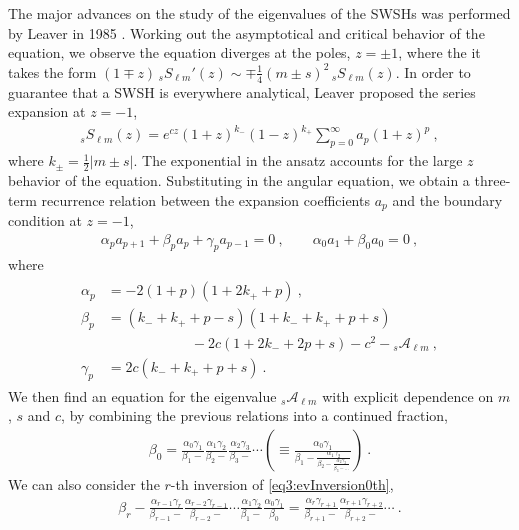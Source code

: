 The major advances on the study of the eigenvalues of the SWSHs was performed by Leaver in 1985 \cite{Leaver1985, Leaver1986}. Working out the asymptotical and critical behavior of the equation, we observe the equation diverges at the poles, $z = \pm 1$, where the it takes the form $(1 \mp z) \,{}_{s}S_{\ell m}{}'(z) \sim \mp \tfrac{1}{4} (m \pm s)^2 \, {}_{s}S_{\ell m}(z)$. In order to guarantee that a SWSH is everywhere analytical, Leaver proposed the series expansion at $z=-1$,
\begin{align}
    \label{eq3:SWSHseriesLeaver}
    {}_{s}S_{\ell m}(z) = e^{c z} (1+z)^{k_-} (1-z)^{k_+} \sum_{p=0}^\infty a_p (1+z)^p ~,
\end{align}
where $k_{\pm} = \tfrac{1}{2}|m \pm s|$.
The exponential in the ansatz accounts for the large $z$ behavior of the equation.
Substituting in the angular equation, we obtain a three-term recurrence relation between the expansion coefficients $a_p$ and the boundary condition at $z=-1$,
\begin{align}
    \label{eq3:ap3CoefRecursion}
    \alpha_p a_{p+1} + \beta_p a_p + \gamma_p a_{p-1} = 0 ~,\qquad
    \alpha_0 a_1 + \beta_0 a_0 = 0 ~,
\end{align}
where
\begin{align}
    \label{eq3:LeaverCoefRecursion}
    \begin{split}
        \alpha_p &= -2 (1 + p) (1 + 2 k_{+} + p) ~,\\
        \beta_p  &= (k_{-} + k_{+} + p - s) (1 + k_{-} + k_{+} + p + s) \\
        &\qquad\qquad\qquad - 2 c (1 + 2 k_{-} + 2 p + s) - c^2 - {}_{s}\mathscr{A}_{\ell m} ~,\\
        \gamma_p &= 2 c (k_{-} + k_{+} + p + s) ~.
    \end{split}
\end{align}
We then find an equation for the eigenvalue ${}_{s}\mathscr{A}_{\ell m}$ with explicit dependence on $m$, $s$ and $c$, by combining the previous relations into a continued fraction,
\begin{align}
    \label{eq3:evInversion0th}
    \beta_0 = \frac{\alpha_0 \gamma_1}{\beta_1 -} \frac{\alpha_1 \gamma_2}{\beta_2 -} \frac{\alpha_2 \gamma_3}{\beta_3 -} \cdots \left( \equiv  \frac{\alpha_0 \gamma_1}{\beta_1 - \frac{\alpha_1 \gamma_2}{\beta_2 - \frac{\alpha_2 \gamma_3}{\beta_3 - \dots}}} \right)  ~.
\end{align}
We can also consider the $r$-th inversion of \eqref{eq3:evInversion0th},
\begin{align}
    \label{eq3:evInversionRth}
    \beta_r - \frac{\alpha_{r-1} \gamma_r}{\beta_{r-1} -} \frac{\alpha_{r-2} \gamma_{r-1}}{\beta_{r-2} -} \cdots \frac{\alpha_{1} \gamma_2}{\beta_{1} -} \frac{\alpha_{0} \gamma_{1}}{\beta_{0}} = \frac{\alpha_{r} \gamma_{r+1}}{\beta_{r+1} -} \frac{\alpha_{r+1} \gamma_{r+2}}{\beta_{r+2} -} \cdots ~.
\end{align}
